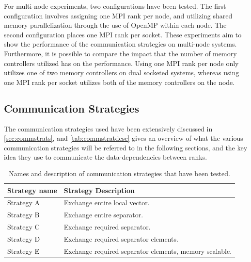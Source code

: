For multi-node experiments, two configurations have been tested. The first configuration involves assigning one MPI rank per node, and utilizing shared memory parallelization through the use of OpenMP within each node. The second configuration places one MPI rank per socket. These experiments aim to show the performance of the communication strategies on multi-node systems. Furthermore, it is possible to compare the impact that the number of memory controllers utilized has on the performance. Using one MPI rank per node only utilizes one of two memory controllers on dual socketed systems, whereas using one MPI rank per socket utilizes both of the memory controllers on the node.



\subsection{Communication Strategies}
The communication strategies used have been extensively discussed in \ref{sec:commstrats}, and \autoref{tab:commstratdesc} gives an overview of what the various communication strategies will be referred to in the following sections, and the key idea they use to communicate the data-dependencies between ranks.

\begin{table}[H]
    \caption{Names and description of communication strategies that have been tested.}
    \label{tab:commstratdesc}
    \begin{center}
        \begin{tabular}[c]{|p{3cm}|p{8.5cm}|}
            \hline
             \textbf{Strategy name}& \textbf{Strategy Description}  \\
            \hline
             Strategy A&Exchange entire local vector.  \\
            \hline
             Strategy B&Exchange entire separator.  \\
            \hline
             Strategy C&Exchange required separator.  \\
            \hline
             Strategy D&Exchange required separator elements.  \\
            \hline
             Strategy E&Exchange required separator elements, memory scalable.  \\
            \hline
        \end{tabular}
    \end{center}
\end{table}


